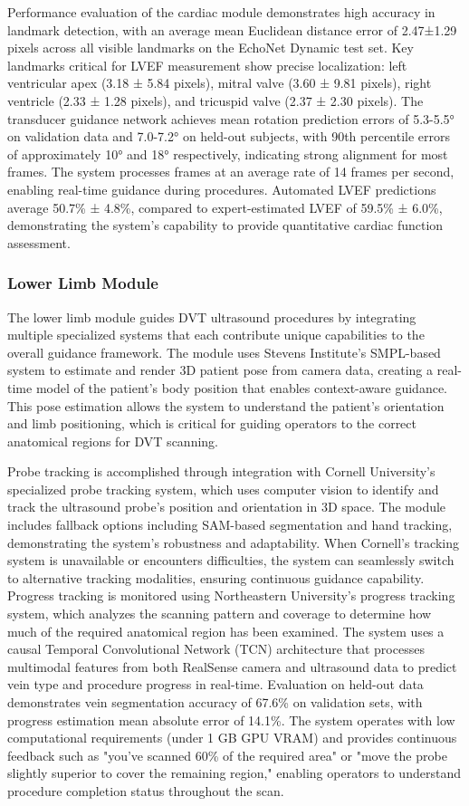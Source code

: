 \documentclass[12pt,a4paper]{article}
\begin{document}
Performance evaluation of the cardiac module demonstrates high accuracy in landmark detection, with an average mean Euclidean distance error of 2.47±1.29 pixels across all visible landmarks on the EchoNet Dynamic test set. Key landmarks critical for LVEF measurement show precise localization: left ventricular apex (3.18 ± 5.84 pixels), mitral valve (3.60 ± 9.81 pixels), right ventricle (2.33 ± 1.28 pixels), and tricuspid valve (2.37 ± 2.30 pixels). The transducer guidance network achieves mean rotation prediction errors of 5.3-5.5° on validation data and 7.0-7.2° on held-out subjects, with 90th percentile errors of approximately 10° and 18° respectively, indicating strong alignment for most frames. The system processes frames at an average rate of 14 frames per second, enabling real-time guidance during procedures. Automated LVEF predictions average 50.7\% ± 4.8\%, compared to expert-estimated LVEF of 59.5\% ± 6.0\%, demonstrating the system's capability to provide quantitative cardiac function assessment.

\subsubsection{Lower Limb Module}

The lower limb module guides DVT ultrasound procedures by integrating multiple specialized systems that each contribute unique capabilities to the overall guidance framework. The module uses Stevens Institute's SMPL-based system to estimate and render 3D patient pose from camera data, creating a real-time model of the patient's body position that enables context-aware guidance. This pose estimation allows the system to understand the patient's orientation and limb positioning, which is critical for guiding operators to the correct anatomical regions for DVT scanning.

Probe tracking is accomplished through integration with Cornell University's specialized probe tracking system, which uses computer vision to identify and track the ultrasound probe's position and orientation in 3D space. The module includes fallback options including SAM-based segmentation and hand tracking, demonstrating the system's robustness and adaptability. When Cornell's tracking system is unavailable or encounters difficulties, the system can seamlessly switch to alternative tracking modalities, ensuring continuous guidance capability. Progress tracking is monitored using Northeastern University's progress tracking system, which analyzes the scanning pattern and coverage to determine how much of the required anatomical region has been examined. The system uses a causal Temporal Convolutional Network (TCN) architecture that processes multimodal features from both RealSense camera and ultrasound data to predict vein type and procedure progress in real-time. Evaluation on held-out data demonstrates vein segmentation accuracy of 67.6\% on validation sets, with progress estimation mean absolute error of 14.1\%. The system operates with low computational requirements (under 1 GB GPU VRAM) and provides continuous feedback such as "you've scanned 60\% of the required area" or "move the probe slightly superior to cover the remaining region," enabling operators to understand procedure completion status throughout the scan.
\end{document}
